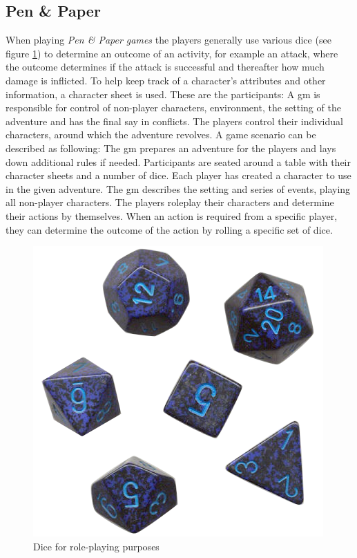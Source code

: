 \subsection{Pen \& Paper}
When playing \emph{Pen \& Paper games} the players generally use various dice (see figure \ref{dice}) to determine an outcome of an activity, for example an attack, where the outcome determines if the attack is successful and thereafter how much damage is inflicted. To help keep track of a character's attributes and other information, a character sheet is used.
These are the participants: A \ac{gm} is responsible for control of non-player characters, environment, the setting of the adventure and has the final say in conflicts. The players control their individual characters, around which the adventure revolves.
A game scenario can be described as following: The \ac{gm} prepares an adventure for the players and lays down additional rules if needed. Participants are seated around a table with their character sheets and a number of dice. Each player has created a character to use in the given adventure. The \ac{gm} describes the setting and series of events, playing all non-player characters. The players roleplay their characters and determine their actions by themselves. When an action is required from a specific player, they can determine the outcome of the action by rolling a specific set of dice.
\begin{figure}[!h]
\centering
\includegraphics[scale=0.35]{img/rpgdice.png}
\caption{Dice for role-playing purposes}
\label{dice}
\end{figure}

